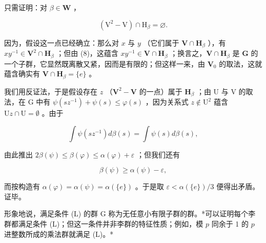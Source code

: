 只需证明：对 \(\beta \in \mathbf{W}\) ，

\[
(\mathrm{V} ^ {2} - \mathrm{V}) \cap \mathrm{H} _ {\beta} = \varnothing .\tag{8}
\]

因为，假设这一点已经确立：那么对 \(x\) 与 \(y\) （它们属于 \(\mathbf{V} \cap \mathbf{H}_{\beta}\) ），有 \(xy^{-1} \in \mathbf{V}^2 \cap \mathbf{H}_{\beta}\) ；但由 (8)，这蕴含 \(xy^{-1} \in \mathbf{V} \cap \mathbf{H}_{\beta}\) ；换言之，\(\mathbf{V} \cap \mathbf{H}_{\beta}\) 是 \(\mathbf{G}\) 的一个子群，它显然既离散又紧，因而是有限的；但这样一来，由 \(\mathbf{V}_0\) 的取法，这就蕴含确实有 \(\mathbf{V} \cap \mathbf{H}_{\beta} = \{e\}\) 。

我们用反证法，于是假设存在 \(z\) （\(\mathbf{V}^2 -\mathbf{V}\) 的一点）属于 \(\mathbf{H}_{\beta}\) ；由 U 与 V 的取法，在 G 中有 \(\psi (sz^{-1}) + \psi (s)\leqslant \varphi (s)\) ，因为关系式 \(z\notin \mathrm{U}^2\) 蕴含 \(\mathrm{U}z\cap \mathrm{U} = \emptyset\) 。由于

\[
\int \psi (s z ^ {- 1}) d \beta (s) = \int \psi (s) d \beta (s),
\]

由此推出 \(2\beta (\psi)\leqslant \beta (\varphi)\leqslant \alpha (\varphi) + \varepsilon\) ；但我们还有

\[
\beta (\psi) \geqslant \alpha (\psi) - \varepsilon ,
\]

而按构造有 \(\alpha(\varphi) = \alpha(\psi) = \alpha(\{e\})\) 。于是取 \(\varepsilon < \alpha(\{e\})/3\) 便得出矛盾。证毕。

形象地说，满足条件 (L) 的群 G 称为无任意小有限子群的群。*可以证明每个李群都满足条件 (L)；但这一条件并非李群的特征性质；例如，模 \(p\) 同余于 1 的 \(p\) 进整数所成的乘法群就满足 (L)。*

